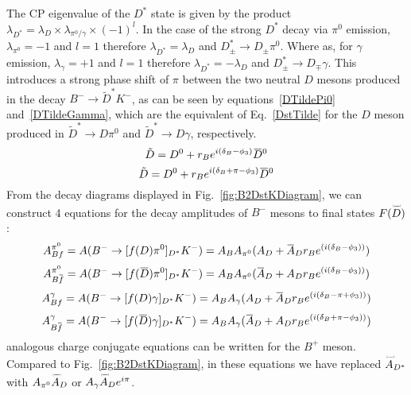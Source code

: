 \documentclass[oneside,12pt]{article}
\newcommand{\overbar}[1]{\mkern 1.5mu\overline{\mkern-1.5mu#1\mkern-1.5mu}\mkern 1.5mu}
\newcommand\brobor{\smash[b]{\raisebox{0.6\height}{\scalebox{0.5}{\tiny(}}{\mkern-1.5mu\scriptstyle-\mkern-1.5mu}\raisebox{0.6\height}{\scalebox{0.5}{\tiny)}}}}
\begin{document}
The CP eigenvalue of the $D^*$ state is given by the product $\lambda_{D^*}=\lambda_D\times \lambda_{\pi^0\text{/}\gamma} \times(-1)^l$. In the case of the strong $D^*$ decay via $\pi^0$ emission, $\lambda_{\pi^0}=-1$ and $l=1$ therefore $\lambda_{D^*}=\lambda_D$ and $D^*_{\pm}\rightarrow D_{\pm}\pi^0$. Where as, for $\gamma$ emission, $\lambda_{\gamma}=+1$ and $l=1$ therefore $\lambda_{D^*}=-\lambda_D$ and $D^*_{\pm}\rightarrow D_{\mp}\gamma$. This introduces a
  strong phase shift of $\pi$ between the two neutral $D$ mesons produced in the decay $B^-\rightarrow \tilde{D}^*K^-$, as can be seen by equations~\eqref{DTildePi0} and~\eqref{DTildeGamma}, which are the equivalent of Eq.~\eqref{DstTilde} for the $D$ meson produced in $\tilde{D}^*\rightarrow D\pi^0$ and $\tilde{D}^*\rightarrow D\gamma$, respectively.
  \begin{equation}
    \tilde{D}=D^0+r_Be^{i(\delta_B-\phi_3)}\overbar{D}^0
    \label{eq:DTildePi0}
  \end{equation}
  \begin{equation}
    \tilde{D}=D^0+r_Be^{i(\delta_B+\pi-\phi_3)}\overbar{D}^0
    \label{eq:DTildeGamma}
  \end{equation}
\noindent From the decay diagrams displayed in Fig.~\ref{fig:B2DstKDiagram}, we can construct 4 equations for the decay amplitudes of $B^{-}$ mesons to final states $F(\accentset{\brobor}{D}\phantom{})$:
  \begin{equation}
    A_{Bf}^{\pi^{0}}=A(B^{-}\rightarrow [f(D)\pi^{0}]_{D^{*}}K^{-})=A_{B}A_{\pi^{0}}(A_{D}+\overbar{A}_{D}r_{B}e^{(i(\delta_{B}-\phi_{3}))})
    \label{eq:A(Bf)pi0}
  \end{equation}
  \begin{equation}
    A_{B\overbar{f}}^{\pi^{0}}=A(B^{-}\rightarrow [f(\overbar{D})\pi^{0}]_{D^{*}}K^{-})=A_{B}A_{\pi^{0}}(\overbar{A}_{D}+A_{D}r_{B}e^{(i(\delta_{B}-\phi_{3}))})
    \label{eq:A(Bfbar)pi0}
  \end{equation}
  \begin{equation}
    A_{Bf}^{\gamma}=A(B^{-}\rightarrow [f(D)\gamma]_{D^{*}}K^{-})=A_{B}A_{\gamma}(A_{D}+\overbar{A}_{D}r_{B}e^{(i(\delta_{B}-\pi+\phi_{3}))})
    \label{eq:A(Bf)gamma}
  \end{equation}
  \begin{equation}
    A_{B\overbar{f}}^{\gamma}=A(B^{-}\rightarrow [f(\overbar{D})\gamma]_{D^{*}}K^{-})=A_{B}A_{\gamma}(\overbar{A}_{D}+A_{D}r_{B}e^{(i(\delta_{B}+\pi-\phi_{3}))})
    \label{eq:A(Bfbar)gamma}
  \end{equation}
 analogous charge conjugate equations can be written for the $B^{+}$ meson. Compared to Fig.~\ref{fig:B2DstKDiagram}, in these equations we have replaced $\accentset{\brobor}{A}\phantom{}_{D^{*}}$ with $A_{\pi^{0}}\accentset{\brobor}{A}\phantom{}_{D}$ or $A_{\gamma}\accentset{\brobor}{A}\phantom{}_{D}e^{{i\pi}}$. 
\end{document}
